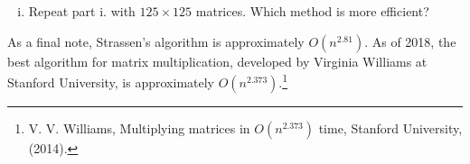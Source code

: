 \begin{pactivity}
\begin{enumerate}[i.]
\item Repeat part i. with $125 \times 125$ matrices. Which method is more efficient?
	
	\end{enumerate}
\ea

\end{pactivity}


As a final note, Strassen's algorithm is approximately $O{\left(n^{2.81}\right)}$. As of 2018, the best algorithm for matrix multiplication, developed by Virginia Williams at Stanford University,  is approximately $O{\left(n^{2.373}\right)}$.\footnote{V. V. Williams, Multiplying matrices in $O{\left(n^{2.373}\right)}$ time, Stanford University, (2014).}





